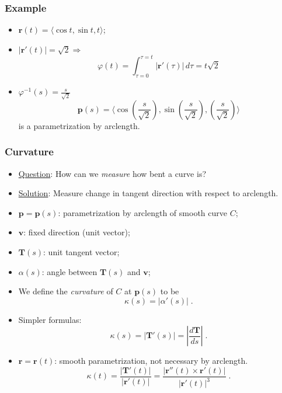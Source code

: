 \begin{frame}
  \frametitle{Example}

  \begin{itemize}
    \item $\textbf{r}(t) = \langle \cos{t}, \sin{t}, t\rangle$;
    \item $|\textbf{r}'(t)| = \sqrt{2} \Longrightarrow $
    $$\varphi(t) = \int_{\tau=0}^{\tau=t}|\textbf{r}'(\tau)|\, d\tau =  t\sqrt{2}$$
    \item $\varphi^{-1}(s) = \frac{s}{\sqrt{2}}$
    $$\textbf{p}(s) = \langle \cos{\left( \frac{s}{\sqrt{2}} \right)}, \sin{\left( \frac{s}{\sqrt{2}} \right)}, \left( \frac{s}{\sqrt{2}} \right) \rangle$$
    is a parametrization by arclength.
  \end{itemize}
\end{frame}

\begin{frame}
  \frametitle{Curvature}
  
  \begin{itemize}
    \item \underline{Question}: How can we \emph{measure} how bent a curve is?
    \item \underline{Solution}: Measure change in tangent
direction with respect to arclength.
  \end{itemize}
  
  \begin{itemize}
    \item $\textbf{p}=\textbf{p}(s)$: parametrization by arclength of smooth curve $C$;
    \item $\textbf{v}$: fixed direction (unit vector);
    \item $\textbf{T}(s)$: unit tangent vector;
    \item $\alpha(s)$: angle between $\textbf{T}(s)$ and $\textbf{v}$;
    \item We define the \emph{curvature} of $C$ at $\textbf{p}(s)$ to be
        $$\kappa(s) = \left| \alpha'(s) \right|\; .$$
    \item Simpler formulas:
    $$\kappa(s) = | \textbf{T}'(s) | = \left| \frac{d\textbf{T}}{ds}\right| \; .$$
    \item $\textbf{r}=\textbf{r}(t)$: smooth parametrization, not necessary by arclength.
    $$\kappa(t) = \frac{|\textbf{T}'(t)|}{|\textbf{r}'(t)|} = \frac{|\textbf{r}''(t) \times \textbf{r}'(t)|}
{|\textbf{r}'(t)|^3}\; .$$
  \end{itemize}
  
\end{frame}

